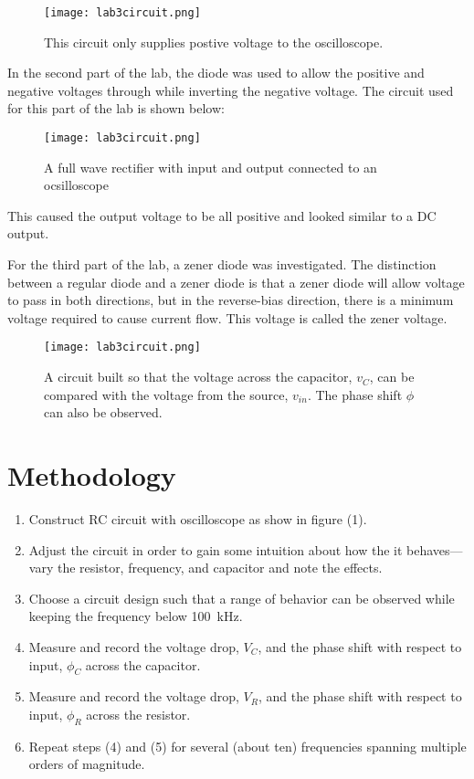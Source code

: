 \documentclass[twocolumn, amsmath]{revtex4}
\begin{document}
\begin{figure}
    \texttt{[image: lab3circuit.png]}  
    \caption{This circuit only supplies postive voltage to the oscilloscope.}
\end{figure}

In the second part of the lab, the diode was used to allow the positive and negative voltages through while inverting the negative voltage. The circuit used for this part of the lab is shown below:

\begin{figure}
    \texttt{[image: lab3circuit.png]}  
    \caption{A full wave rectifier with input and output connected to an ocsilloscope}
\end{figure}

This caused the output voltage to be all positive and looked similar to a DC output.

For the third part of the lab, a zener diode was investigated. The distinction between a regular diode and a zener diode is that a zener diode will allow voltage to pass in both directions, but in the reverse-bias direction, there is a minimum voltage required to cause current flow. This voltage is called the zener voltage.




\begin{figure}
    \texttt{[image: lab3circuit.png]}  
    \caption{A circuit built so that the voltage across the capacitor, $v_C$, can be compared with the voltage from the source, $v_{in}$. The phase shift $\phi$ can also be observed.}
\end{figure}



\section{Methodology}

\begin{enumerate}
    \item Construct RC circuit with oscilloscope as show in figure (1).
    \item Adjust the circuit in order to gain some intuition about how the it behaves--- vary the resistor, frequency, and capacitor and note the effects. 
    \item Choose a circuit design such that a range of behavior can be observed while keeping the frequency below \SI{100}{\kilo\hertz}.
    \item Measure and record the voltage drop, $V_C$, and the phase shift with respect to input, $\phi_C$ across the capacitor. 
    \item Measure and record the voltage drop, $V_R$, and the phase shift with respect to input, $\phi_R$ across the resistor. 
    \item Repeat steps (4) and (5) for several (about ten) frequencies spanning multiple orders of magnitude.
\end{enumerate}
\end{document}
